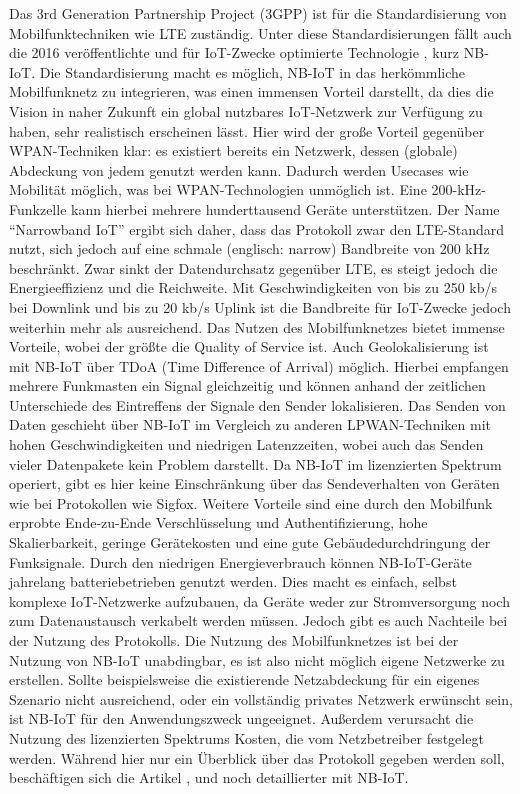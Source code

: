 Das 3rd Generation Partnership Project (3GPP) ist für die Standardisierung von Mobilfunktechniken wie LTE zuständig. Unter diese Standardisierungen fällt auch die 2016 veröffentlichte und für IoT-Zwecke optimierte Technologie , kurz NB-IoT. Die Standardisierung macht es möglich, NB-IoT in das herkömmliche Mobilfunknetz zu integrieren, was einen immensen Vorteil darstellt, da dies die Vision in naher Zukunft ein global nutzbares IoT-Netzwerk zur Verfügung zu haben, sehr realistisch erscheinen lässt. Hier wird der große Vorteil gegenüber WPAN-Techniken klar: es existiert bereits ein Netzwerk, dessen (globale) Abde\-ckung von jedem genutzt werden kann. Dadurch werden Usecases wie Mobilität möglich, was bei WPAN-Technologien unmöglich ist. Eine 200-kHz-Funkzelle kann hierbei mehrere hunderttausend Geräte unterstützen. Der Name ``Narrowband IoT'' ergibt sich daher, dass das Protokoll zwar den LTE-Standard nutzt, sich jedoch auf eine schmale (englisch: narrow) Bandbreite von 200 kHz beschränkt. Zwar sinkt der Datendurchsatz gegenüber LTE, es steigt jedoch die Energieeffizienz und die Reichweite. Mit Geschwindigkeiten von bis zu 250 kb/s bei Downlink und bis zu 20 kb/s Uplink ist die Bandbreite für IoT-Zwecke jedoch weiterhin mehr als ausreichend. Das Nutzen des Mobilfunknetzes bietet immense Vorteile, wobei der größte die Quality of Service ist. Auch Geolokalisierung ist mit NB-IoT über TDoA (Time Difference of Arrival) möglich. Hierbei empfangen mehrere Funkmasten ein Signal gleichzeitig und können anhand der zeitlichen Unterschiede des Eintreffens der Signale den Sender lokalisieren. Das Senden von Daten geschieht über NB-IoT im Vergleich zu anderen LPWAN-Techniken mit hohen Geschwindigkeiten und niedrigen Latenzzeiten, wobei auch das Senden vieler Datenpakete kein Problem darstellt. Da NB-IoT im lizenzierten Spektrum operiert, gibt es hier keine Einschränkung über das Sendeverhalten von Geräten wie bei Protokollen wie Sigfox. Weitere Vorteile sind eine durch den Mobilfunk erprobte Ende-zu-Ende Verschlüsselung und Authentifizierung, hohe Skalierbarkeit, geringe Gerätekosten und eine gute Gebäudedurchdringung der Funksignale. Durch den niedrigen Energieverbrauch können NB-IoT-Geräte jahrelang batteriebetrieben genutzt werden. Dies macht es einfach, selbst komplexe IoT-Netzwerke aufzubauen, da Geräte weder zur Stromversorgung noch zum Datenaustausch verkabelt werden müssen. Jedoch gibt es auch Nachteile bei der Nutzung des Protokolls. Die Nutzung des Mobilfunknetzes ist bei der Nutzung von NB-IoT unabdingbar, es ist also nicht möglich eigene Netzwerke zu erstellen. Sollte beispielsweise die existierende Netz\-abdeckung für ein eigenes Szenario nicht ausreichend, oder ein vollständig privates Netzwerk erwünscht sein, ist NB-IoT für den Anwendungszweck ungeeignet. Außerdem verursacht die Nutzung des lizenzierten Spektrums Kosten, die vom Netzbetreiber festgelegt werden. Während hier nur ein Überblick über das Protokoll gegeben werden soll, beschäftigen sich die Artikel \cite{Aernouts.2018}, \cite{Vodafone.2017} und \cite{Ding.2020} noch detaillierter mit NB-IoT.

